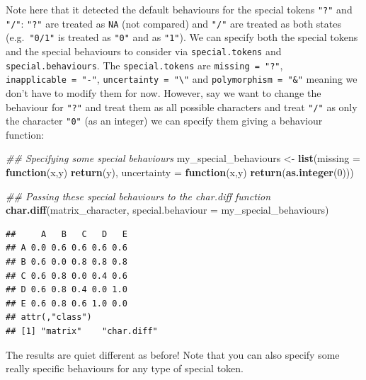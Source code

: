 \documentclass[
]{book}
\newenvironment{Shaded}{\begin{snugshade}}{\end{snugshade}}
\newcommand{\CommentTok}[1]{\textcolor[rgb]{0.56,0.35,0.01}{\textit{#1}}}
\newcommand{\ControlFlowTok}[1]{\textcolor[rgb]{0.13,0.29,0.53}{\textbf{#1}}}
\newcommand{\DataTypeTok}[1]{\textcolor[rgb]{0.13,0.29,0.53}{#1}}
\newcommand{\DecValTok}[1]{\textcolor[rgb]{0.00,0.00,0.81}{#1}}
\newcommand{\KeywordTok}[1]{\textcolor[rgb]{0.13,0.29,0.53}{\textbf{#1}}}
\newcommand{\NormalTok}[1]{#1}
\newcommand{\StringTok}[1]{\textcolor[rgb]{0.31,0.60,0.02}{#1}}
\begin{document}
Note here that it detected the default behaviours for the special tokens \texttt{"?"} and \texttt{"/"}: \texttt{"?"} are treated as \texttt{NA} (not compared) and \texttt{"/"} are treated as both states (e.g.~\texttt{"0/1"} is treated as \texttt{"0"} and as \texttt{"1"}).
We can specify both the special tokens and the special behaviours to consider via \texttt{special.tokens} and \texttt{special.behaviours}.
The \texttt{special.tokens} are \texttt{missing\ =\ "?"}, \texttt{inapplicable\ =\ "-"}, \texttt{uncertainty\ =\ "\textbackslash{}"} and \texttt{polymorphism\ =\ "\&"} meaning we don't have to modify them for now.
However, say we want to change the behaviour for \texttt{"?"} and treat them as all possible characters and treat \texttt{"/"} as only the character \texttt{"0"} (as an integer) we can specify them giving a behaviour function:

\begin{Shaded}
\begin{Highlighting}[]
\CommentTok{\#\# Specifying some special behaviours}
\NormalTok{my\_special\_behaviours \textless{}{-}}\StringTok{ }\KeywordTok{list}\NormalTok{(}\DataTypeTok{missing =} \ControlFlowTok{function}\NormalTok{(x,y) }\KeywordTok{return}\NormalTok{(y),}
                              \DataTypeTok{uncertainty =} \ControlFlowTok{function}\NormalTok{(x,y) }\KeywordTok{return}\NormalTok{(}\KeywordTok{as.integer}\NormalTok{(}\DecValTok{0}\NormalTok{)))}

\CommentTok{\#\# Passing these special behaviours to the char.diff function}
\KeywordTok{char.diff}\NormalTok{(matrix\_character, }\DataTypeTok{special.behaviour =}\NormalTok{ my\_special\_behaviours)}
\end{Highlighting}
\end{Shaded}

\begin{verbatim}
##     A   B   C   D   E
## A 0.0 0.6 0.6 0.6 0.6
## B 0.6 0.0 0.8 0.8 0.8
## C 0.6 0.8 0.0 0.4 0.6
## D 0.6 0.8 0.4 0.0 1.0
## E 0.6 0.8 0.6 1.0 0.0
## attr(,"class")
## [1] "matrix"    "char.diff"
\end{verbatim}

The results are quiet different as before! Note that you can also specify some really specific behaviours for any type of special token.
\end{document}
